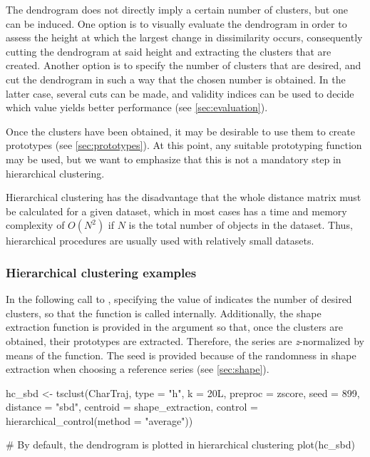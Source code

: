 The dendrogram does not directly imply a certain number of clusters, but one can be induced.
One option is to visually evaluate the dendrogram in order to assess the height at which the largest change in dissimilarity occurs,
consequently cutting the dendrogram at said height and extracting the clusters that are created.
Another option is to specify the number of clusters that are desired,
and cut the dendrogram in such a way that the chosen number is obtained.
In the latter case,
several cuts can be made,
and validity indices can be used to decide which value yields better performance (see \cref{sec:evaluation}).

Once the clusters have been obtained,
it may be desirable to use them to create prototypes (see \cref{sec:prototypes}).
At this point, any suitable prototyping function may be used,
but we want to emphasize that this is not a mandatory step in hierarchical clustering.

Hierarchical clustering has the disadvantage that the whole distance matrix must be calculated for a given dataset,
which in most cases has a time and memory complexity of $O(N^2)$ if $N$ is the total number of objects in the dataset.
Thus, hierarchical procedures are usually used with relatively small datasets.

\subsubsection{Hierarchical clustering examples}

In the following call to ,
specifying the value of  indicates the number of desired clusters,
so that the  function is called internally.
Additionally, the shape extraction function is provided in the  argument so that,
once the  clusters are obtained,
their prototypes are extracted.
Therefore, the series are \textit{z}-normalized by means of the  function.
The seed is provided because of the randomness in shape extraction when choosing a reference series (see \cref{sec:shape}).

\begin{example}
hc_sbd <- tsclust(CharTraj, type = "h", k = 20L,
                  preproc = zscore, seed = 899,
                  distance = "sbd", centroid = shape_extraction,
                  control = hierarchical_control(method = "average"))

# By default, the dendrogram is plotted in hierarchical clustering
plot(hc_sbd)
\end{example}


